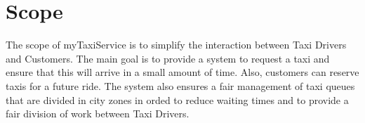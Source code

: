 \documentclass[../../../../dd.tex]{subfiles}
\begin{document}
	\section{Scope}
		The scope of myTaxiService is to simplify the interaction between Taxi Drivers and Customers.
		The main goal is to provide a system to request a taxi and ensure that this will arrive in a small amount of time. Also, customers can reserve taxis for a future ride.
		The system also ensures a fair management of taxi queues that are divided in city zones in orded to reduce waiting times and to provide a fair division of work between Taxi Drivers.
\end{document}
